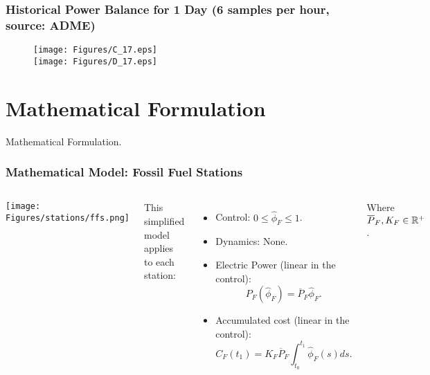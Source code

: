 
\begin{frame}
\frametitle{Historical Power Balance for 1 Day (6 samples per hour, source: ADME)}
\begin{figure}[ht!]
\centering
\texttt{[image: Figures/C\_17.eps]}\\
\texttt{[image: Figures/D\_17.eps]}
\end{figure}
\end{frame}


\section{Mathematical Formulation}
{ 
\begin{frame}[noframenumbering]
\centering
{\Huge Mathematical Formulation.}
\end{frame}}


\begin{frame}
\frametitle{Mathematical Model: Fossil Fuel Stations}

\begin{columns}[c]

\texttt{[image: Figures/stations/ffs.png]}

This simplified model applies to each station:
\begin{itemize}
\item Control: $0\leq\hat{\phi}_F\leq1$.
\item Dynamics: None.
\item Electric Power (linear in the control):
\begin{equation*}
P_F\left(\hat{\phi}_F\right)=\overline{P}_F\hat{\phi}_F.
\end{equation*}
\item Accumulated cost (linear in the control):
\begin{equation*}
C_F(t_1)=K_F\overline{P}_F\int_{t_0}^{t_1}\hat{\phi}_F(s)ds.
\end{equation*}
\end{itemize}
Where $\overline{P}_F,K_F\in\mathbb{R}^+$.
\end{columns}
\end{frame}

